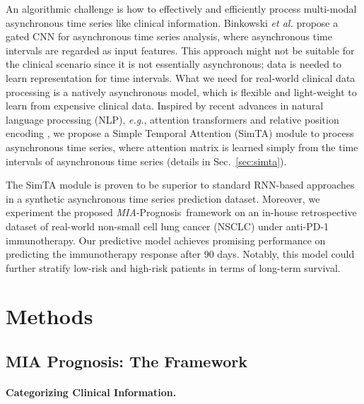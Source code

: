\documentclass[runningheads]{llncs}
\newcommand{\eg}{\textit{e.g.}}
\newcommand{\miap}{\emph{MIA}-Prognosis}
\begin{document}
An algorithmic challenge is how to effectively and efficiently process multi-modal asynchronous time series like clinical information. Binkowski \emph{et al.} \cite{Binkowski2017AutoregressiveCN} propose a gated CNN for asynchronous time series analysis, where asynchronous time intervals are regarded as input features. This approach might not be suitable for the clinical scenario since it is not essentially asynchronous; data is needed to learn representation for time intervals. What we need for real-world clinical data processing is a natively asynchronous model, which is flexible and light-weight to learn from expensive clinical data. Inspired by recent advances in natural language processing (NLP), \eg, attention transformers \cite{Vaswani2017AttentionIA,yang2019modeling,Devlin2019BERTPO} and relative position encoding \cite{Shaw2018SelfAttentionWR}, we propose a Simple Temporal Attention (SimTA) module to process asynchronous time series, where attention matrix is learned simply from the time intervals of asynchronous time series (details in Sec.~\ref{sec:simta}). 

The SimTA module is proven to be superior to standard RNN-based approaches in a synthetic asynchronous time series prediction dataset. Moreover, we experiment the proposed \miap~framework on an in-house retrospective dataset of real-world non-small cell lung cancer (NSCLC) under anti-PD-1 immunotherapy. Our predictive model achieves promising performance on predicting the immunotherapy response after 90 days. Notably, this model could further stratify low-risk and high-risk patients in terms of long-term survival.



\section{Methods}

\subsection{MIA Prognosis: The Framework} \label{sec:framework}

\paragraph{\textbf{Categorizing Clinical Information.}}
\end{document}
